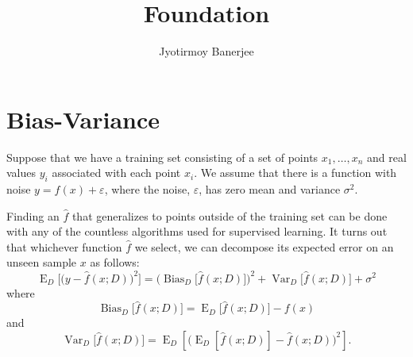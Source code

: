 \documentclass{article}
\title{Foundation}
\author{Jyotirmoy Banerjee}
\begin{document}
\maketitle


\section{Bias-Variance}
Suppose that we have a training set consisting of a set of points $x_{1},\dots ,x_{n}$ and real values $y_{i}$ associated with each point $x_{i}$. We assume that there is a function with noise $y=f(x)+\varepsilon$, where the noise, $\varepsilon$, has zero mean and variance $\sigma^{2}$.

Finding an $\hat{f}$ that generalizes to points outside of the training set can be done with any of the countless algorithms used for supervised learning. It turns out that whichever function $\hat{f}$ we select, we can decompose its expected error on an unseen sample $x$ as follows:
\[ \operatorname {E} _{D}{\Big [}{\big (}y-{\hat {f}}(x;D){\big )}^{2}{\Big ]}={\Big (}\operatorname {Bias} _{D}{\big [}{\hat {f}}(x;D){\big ]}{\Big )}^{2}+\operatorname {Var} _{D}{\big [}{\hat {f}}(x;D){\big ]}+\sigma ^{2} \]
where
\[ \operatorname {Bias} _{D}{\big [}{\hat {f}}(x;D){\big ]}=\operatorname {E} _{D}{\big [}{\hat {f}}(x;D){\big ]}-f(x) \]
and
\[ \operatorname {Var} _{D}{\big [}{\hat {f}}(x;D){\big ]}=\operatorname {E} _{D}[{\big (}\operatorname {E} _{D}[{\hat {f}}(x;D)]-{\hat {f}}(x;D){\big )}^{2}]. \]
\end{document}
